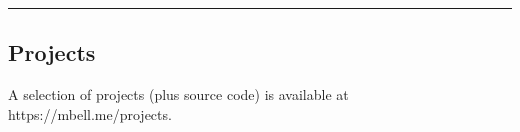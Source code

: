 \documentclass[11pt,a4paper]{article}
\newenvironment{indentsection}[1]%
{\begin{list}{}%
	{\setlength{\leftmargin}{#1}}%
	\item[]%
}
{\end{list}}
\begin{document}
\vspace{-0.4em}
\hrule

\vspace{-1.2em}
\subsection*{Projects}
\begin{indentsection}{\parindent}
	A selection of projects (plus source code) is available at https://mbell.me/projects.
\end{indentsection}
\end{document}
